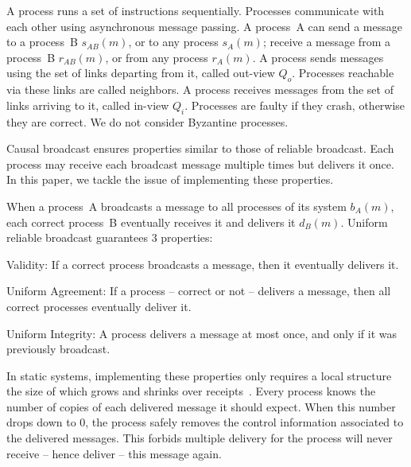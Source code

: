 \begin{definition}[Process]
  A process runs a set of instructions sequentially. Processes communicate with
  each other using asynchronous message passing. A process~A can send a message
  to a process~B $s_{AB}(m)$, or to any process $s_A(m)$; receive a message from
  a process~B $r_{AB}(m)$, or from any process $r_A(m)$. A process sends
  messages using the set of links departing from it, called out-view
  $Q_o$. Processes reachable via these links are called neighbors.  A process
  receives messages from the set of links arriving to it, called in-view $Q_i$.
  Processes are faulty if they crash, otherwise they are correct. We do not
  consider Byzantine processes.
\end{definition}

Causal broadcast ensures properties similar to those of reliable broadcast. Each
process may receive each broadcast message multiple times but delivers it
once. In this paper, we tackle the issue of implementing these properties.

\begin{definition} 
  When a process~A broadcasts a message to all processes of its system $b_A(m)$,
  each correct process~B eventually receives it and delivers it
  $d_B(m)$. Uniform reliable broadcast guarantees 3 properties:
  \begin{inparaenum}[(1)]
  \item Validity: If a correct process broadcasts a message, then it
    eventually delivers it.
  \item Uniform Agreement: If a process -- correct or not -- delivers a message,
    then all correct processes eventually deliver it.
  \item Uniform Integrity: A process delivers a message at most once, and only if
    it was previously broadcast.
  \end{inparaenum}
\end{definition}

In static systems, implementing these properties only requires a local structure
the size of which grows and shrinks over receipts~\cite{raynal2013distributed}.
Every process knows the number of copies of each delivered message it should
expect. When this number drops down to $0$, the process safely removes the
control information associated to the delivered messages. This forbids multiple
delivery for the process will never receive -- hence deliver -- this message
again.

